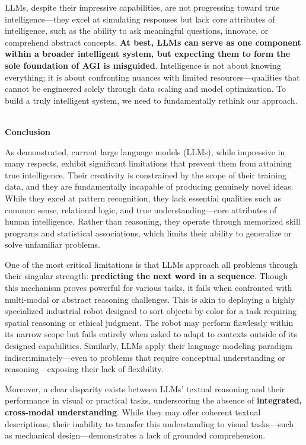 \documentclass[11pt]{scrartcl}
\begin{document}
LLMs, despite their impressive capabilities, are not progressing toward true intelligence—they excel at simulating responses but lack core attributes of intelligence, such as the ability to ask meaningful questions, innovate, or comprehend abstract concepts. \textbf{At best, LLMs can serve as one component within a broader intelligent system, but expecting them to form the sole foundation of AGI is misguided}. Intelligence is not about knowing everything; it is about confronting nuances with limited resources—qualities that cannot be engineered solely through data scaling and model optimization. To build a truly intelligent system, we need to fundamentally rethink our approach. \\ \\

\vspace{1cm}

\begin{huge}
\textbf{Conclusion}
\end{huge}

As demonstrated, current large language models (LLMs), while impressive in many respects, exhibit significant limitations that prevent them from attaining true intelligence. Their creativity is constrained by the scope of their training data, and they are fundamentally incapable of producing genuinely novel ideas. While they excel at pattern recognition, they lack essential qualities such as common sense, relational logic, and true understanding—core attributes of human intelligence. Rather than reasoning, they operate through memorized skill programs and statistical associations, which limits their ability to generalize or solve unfamiliar problems.

One of the most critical limitations is that LLMs approach all problems through their singular strength: \textbf{predicting the next word in a sequence}. Though this mechanism proves powerful for various tasks, it fails when confronted with multi-modal or abstract reasoning challenges. This is akin to deploying a highly specialized industrial robot designed to sort objects by color for a task requiring spatial reasoning or ethical judgment. The robot may perform flawlessly within its narrow scope but fails entirely when asked to adapt to contexts outside of its designed capabilities. Similarly, LLMs apply their language modeling paradigm indiscriminately—even to problems that require conceptual understanding or reasoning—exposing their lack of flexibility.

Moreover, a clear disparity exists between LLMs’ textual reasoning and their performance in visual or practical tasks, underscoring the absence of \textbf{integrated, cross-modal understanding}. While they may offer coherent textual descriptions, their inability to transfer this understanding to visual tasks—such as mechanical design—demonstrates a lack of grounded comprehension.
\end{document}
